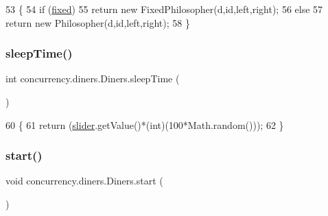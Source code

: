\begin{DoxyCode}
53                                                                     \{
54         \textcolor{keywordflow}{if} (\mbox{\hyperlink{classconcurrency_1_1diners_1_1_diners_a4c5e0aefcf719aeed27ca1bb9dca8294}{fixed}})
55             \textcolor{keywordflow}{return} \textcolor{keyword}{new} FixedPhilosopher(d,\textcolor{keywordtype}{id},left,right);
56          \textcolor{keywordflow}{else}
57             \textcolor{keywordflow}{return} \textcolor{keyword}{new} Philosopher(d,\textcolor{keywordtype}{id},left,right);
58         \}
\end{DoxyCode}
\mbox{\label{classconcurrency_1_1diners_1_1_diners_afda5c09982e95dad9d35038d370f0526}} 
\subsubsection{\texorpdfstring{sleep\+Time()}{sleepTime()}}
{\footnotesize\ttfamily int concurrency.\+diners.\+Diners.\+sleep\+Time (\begin{DoxyParamCaption}{ }\end{DoxyParamCaption})\hspace{0.3cm}{\ttfamily [inline]}}


\begin{DoxyCode}
60                            \{
61         \textcolor{keywordflow}{return} (\mbox{\hyperlink{classconcurrency_1_1diners_1_1_diners_a39973398065942d8583b0c74d4c2365f}{slider}}.getValue()*(int)(100*Math.random()));
62     \}
\end{DoxyCode}
\mbox{\label{classconcurrency_1_1diners_1_1_diners_a125c1910ae8e2052ba0c77e27e7cc6d3}} 
\subsubsection{\texorpdfstring{start()}{start()}}
{\footnotesize\ttfamily void concurrency.\+diners.\+Diners.\+start (\begin{DoxyParamCaption}{ }\end{DoxyParamCaption})\hspace{0.3cm}{\ttfamily [inline]}}


